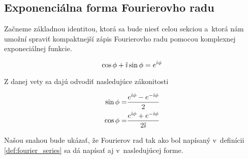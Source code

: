 \subsection{Exponenciálna forma Fourierovho radu}

Začneme základnou identitou, ktorá sa bude niesť celou sekciou a~ktorá
nám umožní spraviť kompaktnejší zápis Fourierovho radu pomocou
komplexnej exponeciálnej funkcie.

\begin{veta}
    \begin{equation*}
        \cos \phi + \hat{\imath} \sin \phi = e^{\hat{\imath} \phi}
    \end{equation*}
\end{veta}

Z danej vety sa dajú odvodiť nasledujúce zákonitosti
\begin{lema}
    \begin{align*}
        \sin \phi =& \frac{e^{\hat{\imath} \phi} - e^{-\hat{\imath} \phi}}{2} \\
        \cos \phi =& \frac{e^{\hat{\imath} \phi} + e^{-\hat{\imath} \phi}}{2\hat{\imath}}
    \end{align*}
\end{lema}

Našou snahou bude ukázať, že Fourierov rad tak ako bol napísaný 
v~definícii \ref{def:fourier_series} sa dá napísať aj v~nasledujúcej
forme.

